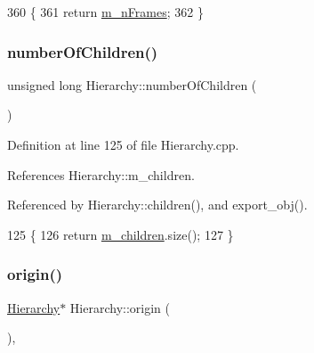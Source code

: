 \begin{DoxyCode}
360                       \{
361     \textcolor{keywordflow}{return} \hyperlink{classUsbFTInterface_a40770504afc4173034c8a8d6c5f5962c}{m\_nFrames};
362   \}
\end{DoxyCode}
\mbox{\label{classHierarchy_ab16e84de65fd84e14001a6cf941c8be4}} 
\subsubsection{\texorpdfstring{number\+Of\+Children()}{numberOfChildren()}}
{\footnotesize\ttfamily unsigned long Hierarchy\+::number\+Of\+Children (\begin{DoxyParamCaption}{ }\end{DoxyParamCaption})\hspace{0.3cm}{\ttfamily [inherited]}}



Definition at line 125 of file Hierarchy.\+cpp.



References Hierarchy\+::m\+\_\+children.



Referenced by Hierarchy\+::children(), and export\+\_\+obj().


\begin{DoxyCode}
125                                            \{
126   \textcolor{keywordflow}{return} \hyperlink{classHierarchy_a038816763941fd4a930504917f60483b}{m\_children}.size();
127 \}
\end{DoxyCode}
\mbox{\label{classHierarchy_aee461dc930ce3871636ff87f075b1b83}} 
\subsubsection{\texorpdfstring{origin()}{origin()}}
{\footnotesize\ttfamily \hyperlink{classHierarchy}{Hierarchy}$\ast$ Hierarchy\+::origin (\begin{DoxyParamCaption}{ }\end{DoxyParamCaption})\hspace{0.3cm}{\ttfamily [inline]}, {\ttfamily [inherited]}}



